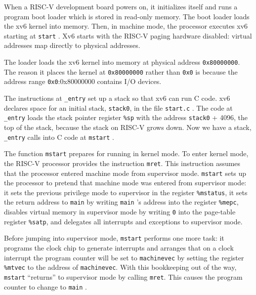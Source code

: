 When a RISC-V development board powers on, it initializes
itself and runs a program boot loader which is stored in read-only
memory.  The boot loader loads the xv6 kernel into memory.  Then, in
machine mode, the processor executes xv6 starting at
\lstinline{start}
.
Xv6 starts with the RISC-V paging hardware disabled:
virtual addresses map directly to physical addresses.

The loader loads the xv6 kernel into memory at physical address
\texttt{0x80000000}.
The reason it places the kernel at
\texttt{0x80000000}
rather than
\texttt{0x0}
is because the address range
\texttt{0x0}:0x80000000
contains I/O devices.

The instructions at
\lstinline{_entry}
set up a stack so that xv6 can run C code.
xv6 declares space for an initial stack,
\lstinline{stack0},
in the file
\lstinline{start.c}
.
The code at
\lstinline{_entry}
loads the stack pointer register
\texttt{\%sp}
with the address
\lstinline{stack0}
+ 4096, the top of the stack, because the stack
on RISC-V grows down.
Now we have a stack,
\lstinline{_entry}
calls into C code at
\lstinline{mstart}
.

The function
\lstinline{mstart}
prepares for running in kernel mode.
To enter kernel mode, the RISC-V processor
provides the instruction
\lstinline{mret}.
This instruction assumes that the processor
entered machine mode from supervisor mode.
\lstinline{mstart}
sets up the processor to pretend
that machine mode was entered
from supervisor mode:
it sets the previous privilege mode to
supervisor in the register
\texttt{\%mstatus},
it sets the return address to
\lstinline{main}
by writing
\lstinline{main} 's
address into
the register
\texttt{\%mepc},
disables virtual memory in supervisor mode
by writing
\lstinline{0}
into the page-table register
\texttt{\%satp},
and delegates all interrupts and exceptions
to supervisor mode.

Before jumping into supervisor mode,
\lstinline{mstart}
performs one more task: it programs the clock
chip to generate interrupts and arranges
that on a clock interrupt the program
counter will be set to
\lstinline{machinevec}
by setting the register
\texttt{\%mtvec}
to the address of
\lstinline{machinevec}.
With this bookkeeping out of the way,
\lstinline{mstart}
``returns'' to supervisor
mode by calling
\lstinline{mret}.
This causes the program counter to change
to
\lstinline{main}
.

